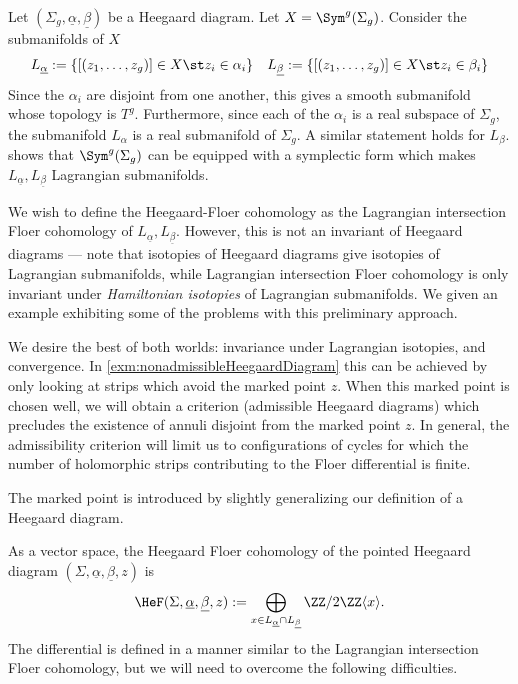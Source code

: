 
Let $(\Sigma_g, \underline{\alpha}, \underline{\beta})$ be a Heegaard diagram. Let $X=\Sym^g(\Sigma_g)$. Consider the submanifolds of $X$
\begin{align*}
    L_{\underline \alpha}:=\{[(z_1, \ldots, z_g)]\in X\st z_i\in \alpha_i\} && 
    L_{\underline \beta}:=\{[(z_1, \ldots, z_g)]\in X\st z_i\in \beta_i\}
\end{align*}
Since the $\alpha_i$ are disjoint from one another, this gives a smooth submanifold whose topology is $T^g$. Furthermore, since each of the $\alpha_i$ is a real subspace of $\Sigma_g$, the submanifold $L_\alpha$ is a real submanifold of $\Sigma_g$. A similar statement holds for $L_\beta$. \Cite{perutz2008handleslide} shows that $\Sym^g(\Sigma_g)$ can be equipped with a symplectic form which makes $L_{\underline \alpha},L_{\underline \beta}$ Lagrangian submanifolds. 

We wish to define the Heegaard-Floer cohomology as the Lagrangian intersection Floer cohomology of $L_{\underline \alpha},L_{\underline \beta}$. However, this is not an invariant of Heegaard diagrams --- note that isotopies of Heegaard diagrams give isotopies of Lagrangian submanifolds, while Lagrangian intersection Floer cohomology is only invariant under \emph{Hamiltonian isotopies} of Lagrangian submanifolds. We given an example exhibiting some of the problems with this preliminary approach.



We desire the best of both worlds: invariance under Lagrangian isotopies, and convergence. In \cref{exm:nonadmissibleHeegaardDiagram} this can be achieved by only looking at strips which avoid the marked point $z$. When this marked point is chosen well, we will obtain a criterion (admissible Heegaard diagrams) which precludes the existence of annuli disjoint from the marked point $z$.  In general, the admissibility criterion will limit us to configurations of cycles for which the number of holomorphic strips contributing to the Floer differential is finite.

The marked point is introduced by slightly generalizing our definition of a Heegaard diagram. 

As a vector space, the Heegaard Floer cohomology of the pointed Heegaard diagram $(\Sigma,\underline{\alpha}, \underline{\beta},z)$ is
\[\HeF(\Sigma, \underline{\alpha}, \underline{\beta},z):=\bigoplus_{x\in L_{\underline \alpha}\cap L_{\underline{\beta}}} \ZZ/2\ZZ\langle x\rangle.\]
The differential is defined in a manner similar to the Lagrangian intersection Floer cohomology, but we will need to overcome the following difficulties.


